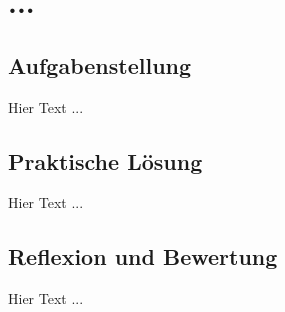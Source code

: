 \chapter{...}
\label{cha:...}

\section{Aufgabenstellung}

Hier Text ... 

\section{Praktische Lösung}

Hier Text ...

\section{Reflexion und Bewertung}

Hier Text ...

\clearpage
